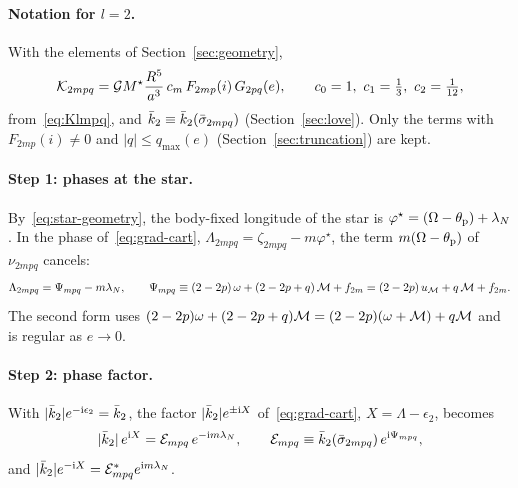 \paragraph{Notation for $l=2$.} With the elements of Section~\ref{sec:geometry},
\begin{equation}
  \mathcal K_{2mpq}=\G M^\star\frac{R^5}{a^3}\,c_m\,F_{2mp}(i)\,G_{2pq}(e),\qquad c_0=1,\ c_1=\tfrac13,\ c_2=\tfrac1{12}, \label{eq:K2}
\end{equation}
from~\eqref{eq:Klmpq}, and $\bar k_2\equiv\bar k_2(\bar\sigma_{2mpq})$ (Section~\ref{sec:love}). Only the terms with $F_{2mp}(i)\neq0$ and $|q|\le q_{\max}(e)$ (Section~\ref{sec:truncation}) are kept.

\paragraph{Step 1: phases at the star.} By~\eqref{eq:star-geometry}, the body-fixed longitude of the star is $\varphi^\star=(\Omega-\theta_{\mathrm p})+\lambda_N$. In the phase of~\eqref{eq:grad-cart}, $\Lambda_{2mpq}=\zeta_{2mpq}-m\varphi^\star$, the term $m(\Omega-\theta_{\mathrm p})$ of $\nu_{2mpq}$ cancels:
\begin{equation}
  \Lambda_{2mpq}=\Psi_{mpq}-m\lambda_N,\qquad \Psi_{mpq}\equiv(2-2p)\,\omega+(2-2p+q)\,\mathcal{M}+f_{2m}=(2-2p)\,u_{\mathcal{M}}+q\,\mathcal{M}+f_{2m}. \label{eq:Psi}
\end{equation}
The second form uses $(2-2p)\omega+(2-2p+q)\mathcal{M}=(2-2p)(\omega+\mathcal{M})+q\mathcal{M}$ and is regular as $e\to0$.

\paragraph{Step 2: phase factor.} With $|\bar k_2|e^{-\mathrm{i}\epsilon_2}=\bar k_2$, the factor $|\bar k_2|e^{\pm\mathrm{i} X}$ of~\eqref{eq:grad-cart}, $X=\Lambda-\epsilon_2$, becomes
\begin{equation}
  |\bar k_2|\,e^{\mathrm{i} X}=\mathcal E_{mpq}\,e^{-\mathrm{i} m\lambda_N},\qquad \mathcal E_{mpq}\equiv\bar k_2(\bar\sigma_{2mpq})\,e^{\mathrm{i}\Psi_{mpq}}, \label{eq:Ecal}
\end{equation}
and $|\bar k_2|e^{-\mathrm{i} X}=\mathcal E^*_{mpq}e^{\mathrm{i} m\lambda_N}$.

